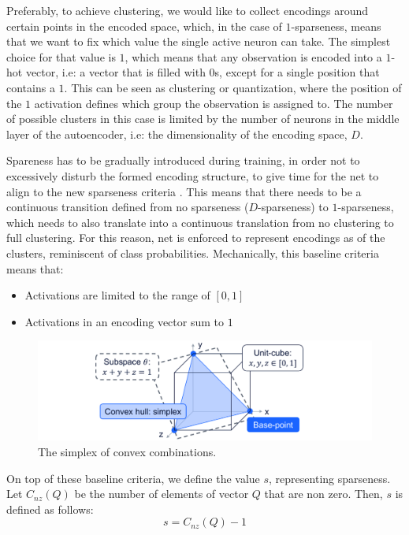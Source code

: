 			Preferably, to achieve clustering, we would like to collect encodings around certain points in the encoded space, which, in the case of $1$-sparseness, means that we want to fix which value the single active neuron can take.
			The simplest choice for that value is $1$, which means that any observation is encoded into a $1$-hot vector, i.e: a vector that is filled with $0$s, except for a single position that contains a $1$.
			This can be seen as clustering or quantization, where the position of the $1$ activation defines which group the observation is assigned to.
			The number of possible clusters in this case is limited by the number of neurons in the middle layer of the autoencoder, i.e: the dimensionality of the encoding space, $D$.
			
			Spareness has to be gradually introduced during training, in order not to excessively disturb the formed encoding structure, to give time for the net to align to the new sparseness criteria \cite{ksparse}.
			This means that there needs to be a continuous transition defined from no sparseness ($D$-sparseness) to $1$-sparseness, which needs to also translate into a continuous translation from no clustering to full clustering.
			For this reason, net is enforced to represent encodings as  of the clusters, reminiscent of class probabilities.
			Mechanically, this baseline criteria means that:
			\begin{itemize}
				\item Activations are limited to the range of $[0, 1]$
				\item Activations in an encoding vector sum to $1$
			\end{itemize}
		
			\begin{figure}[ht]
				\centering
				\includegraphics[width=\linewidth]{figures/06_sparse_clust/simplex/simplex.pdf}
				\caption[The simplex of convex combinations]{The simplex of convex combinations.}
				\label{fig:simplex}
			\end{figure}
			
			On top of these baseline criteria, we define the value $s$, representing sparseness.
			Let $C_{nz}(Q)$ be the number of elements of vector $Q$ that are non zero.
			Then, $s$ is defined as follows:
			\begin{equation*}
				s = C_{nz}(Q) - 1
			\end{equation*}
			
